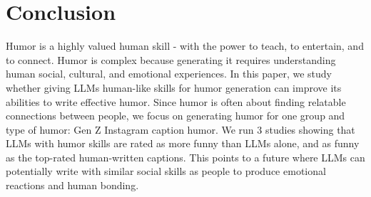 \section{Conclusion}
Humor is a highly valued human skill - with the power to teach, to entertain, and to connect. Humor is complex because generating it requires understanding human social, cultural, and emotional experiences.
In this paper, we study whether giving LLMs human-like skills for humor generation can improve its abilities to write effective humor. Since humor is often about finding relatable connections between people, we focus on generating humor for one group and type of humor: Gen Z Instagram caption humor. We run 3 studies showing that LLMs with humor skills are rated as more funny than LLMs alone, and as funny as the top-rated human-written captions. This points to a future where LLMs can potentially write with similar social skills as people to produce emotional reactions and human bonding.
